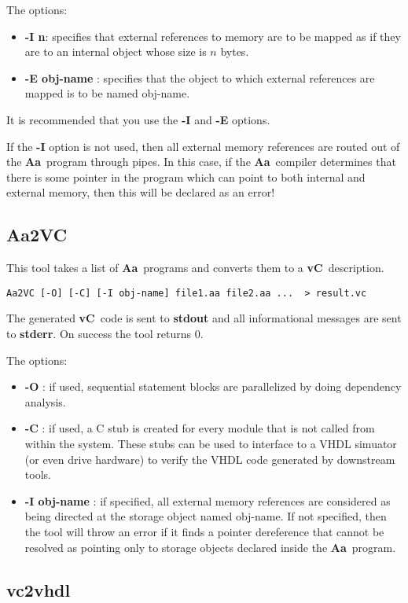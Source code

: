 \documentclass{article}
\newcommand{\Aa}{{\bf Aa}~}
\newcommand{\vC}{{\bf vC}~}
\begin{document}
The options:
\begin{itemize}
\item {\bf -I n}: specifies that external references to memory
are to be mapped as if they are to an internal object whose size
is $n$ bytes.
\item {\bf -E obj-name} : specifies that the object to which
external references are mapped is to be named obj-name.
\end{itemize}
It is recommended that you use the {\bf -I} and {\bf -E} options.  

If the {\bf -I} option is not used, then all external memory
references are routed out of the \Aa program through pipes.
In this case, if the \Aa compiler determines that there is some pointer 
in the program which can point
to both internal and external memory, then this will be
declared as an error!  

\subsection{{\bf Aa2VC}}

This tool takes a list of \Aa programs and converts them
to a \vC description. 
\begin{verbatim}
Aa2VC [-O] [-C] [-I obj-name] file1.aa file2.aa ...  > result.vc
\end{verbatim}
The generated \vC code is sent to {\bf stdout} and all informational
messages are sent to {\bf stderr}.  On success the tool returns 0.

The options:
\begin{itemize}
\item {\bf -O} : if used, sequential statement blocks are parallelized
by doing dependency analysis.
\item {\bf -C} : if used, a C stub is created for every module that
is not called from within the system.  These stubs can be used to
interface to a VHDL simuator (or even drive hardware) to verify
the VHDL code generated by downstream tools.
\item {\bf -I obj-name} : if specified, all external memory references
are considered as being directed at the storage object named obj-name.
If not specified, then the tool will throw an error if it finds
a pointer dereference that cannot be resolved as pointing only to
storage objects declared inside the \Aa program.
\end{itemize}

\subsection{\bf vc2vhdl}
\end{document}
